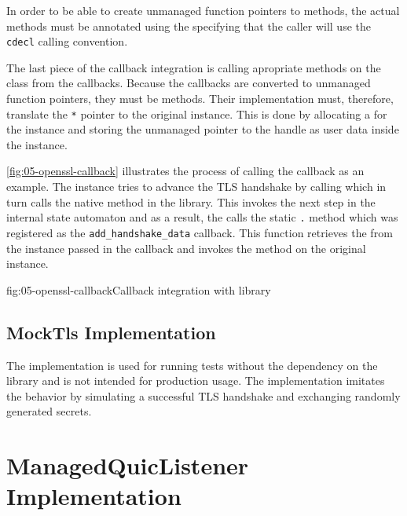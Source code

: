 In order to be able to create unmanaged function pointers to \csharp{} methods, the actual methods
must be annotated using the  specifying that the caller will
use the \texttt{cdecl} calling convention.

The last piece of the \libopenssl{} callback integration is calling apropriate methods on the
\ManagedQuicConnection{} class from the callbacks. Because the callbacks are converted to unmanaged
function pointers, they must be  methods. Their implementation must, therefore,
translate the \texttt{\SSL{}*} pointer to the original \OpenSslTls{} instance. This is done by
allocating a  for the \OpenSslTls{} instance and storing the unmanaged pointer to
the handle as user data inside the \SSL{} instance.

\autoref{fig:05-openssl-callback} illustrates the process of calling the 
callback as an example. The \ManagedQuicConnection{} instance tries to advance the TLS handshake by
calling  which in turn calls the  native method
in the \libopenssl{} library. This invokes the next step in the internal state automaton and as a
result, the \libopenssl{} calls the static \texttt{\OpenSslTls{}.} method
which was registered as the \texttt{add_handshake_data} callback. This function retrieves the
 from the \SSL{} instance passed in the callback and invokes the
 method on the original \ManagedQuicConnection{} instance.

\begin{myFigure}{fig:05-openssl-callback}{Callback integration with \libopenssl{} library}

  \resizebox{\linewidth}{!}{}

\end{myFigure}

\subsection{MockTls Implementation}

The \MockTls{} implementation is used for running tests without the dependency on the \libopenssl{}
library and is not intended for production usage. The implementation imitates the \OpenSslTls{}
behavior by simulating a successful TLS handshake and exchanging randomly generated secrets.

\section{ManagedQuicListener Implementation}

